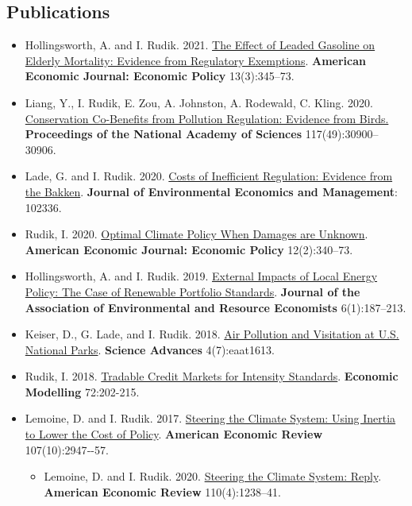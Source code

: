 \documentclass[11pt]{res} %
\begin{document}
\begin{resume}
\subsection{Publications}
\begin{itemize}
	\item[] Hollingsworth, A. and I. Rudik. 2021. \href{https://osf.io/preprints/socarxiv/rdy6g}{The Effect of Leaded Gasoline on Elderly Mortality: Evidence from Regulatory Exemptions}. \textbf{American Economic Journal: Economic Policy} 13(3):345--73.
	\item[] Liang, Y., I. Rudik, E. Zou, A. Johnston, A. Rodewald, C. Kling. 2020. \href{https://www.pnas.org/content/early/2020/11/23/2013568117}{Conservation Co-Benefits from Pollution Regulation: Evidence from Birds.} \textbf{Proceedings of the National Academy of Sciences} 117(49):30900--30906.
	\item[] Lade, G. and I. Rudik. 2020. \href{https://papers.ssrn.com/sol3/papers.cfm?abstract_id=3086728}{Costs of Inefficient Regulation: Evidence from the Bakken}. \textbf{Journal of Environmental Economics and Management}: 102336.
	\item[] Rudik, I. 2020. \href{https://www.aeaweb.org/articles?id=10.1257/pol.20160541}{Optimal Climate Policy When Damages are Unknown}. \textbf{American Economic Journal: Economic Policy} 12(2):340--73.
	\item[] Hollingsworth, A. and I. Rudik. 2019. \href{http://papers.ssrn.com/sol3/papers.cfm?abstract_id=2697222}{External Impacts of Local Energy Policy: The Case of Renewable Portfolio Standards}. \textbf{Journal of the Association of Environmental and Resource Economists} 6(1):187--213.
	\item[] Keiser, D., G. Lade, and I. Rudik. 2018. \href{http://advances.sciencemag.org/content/4/7/eaat1613}{Air Pollution and Visitation at U.S. National Parks}. \textbf{Science Advances} 4(7):eaat1613.
	\item[] Rudik, I. 2018. \href{https://www.sciencedirect.com/science/article/pii/S0264999317315651}{Tradable Credit Markets for Intensity Standards}. \textbf{Economic Modelling} 72:202-215.
	\item[] Lemoine, D. and I. Rudik. 2017.  \href{http://papers.ssrn.com/sol3/papers.cfm?abstract_id=2443594}{Steering the Climate System: Using Inertia to Lower the Cost of Policy}. \textbf{American Economic Review} 107(10):2947‐-57.
	\begin{itemize}
		\item[] Lemoine, D. and I. Rudik. 2020.  \href{http://papers.ssrn.com/sol3/papers.cfm?abstract_id=2443594}{Steering the Climate System: Reply}. \textbf{American Economic Review} 110(4):1238--41.

\end{itemize}
\end{itemize}
\end{resume}
\end{document}
